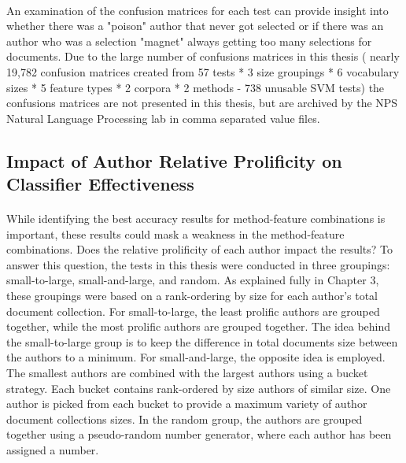 	\paragraph*{} An examination of the confusion matrices for each test can provide insight into whether there was a "poison" author that never got selected or if there was an author who was a selection "magnet" always getting too many selections for documents.  Due to the large number of confusions matrices in this thesis ( nearly 19,782 confusion matrices created from 57 tests * 3 size groupings * 6 vocabulary sizes * 5 feature types * 2 corpora * 2 methods -  738 unusable SVM tests) the confusions matrices are not presented in this thesis, but are archived by the NPS Natural Language Processing lab in comma separated value files.

\begin{singlespace}
\section{Impact of Author Relative Prolificity on Classifier Effectiveness}
\end{singlespace}
	\paragraph*{} While identifying the best accuracy results for method-feature combinations is important, these results could mask a weakness in the method-feature combinations.  Does the relative prolificity of each author impact the results?  To answer this question, the tests in this thesis were conducted in three groupings: small-to-large, small-and-large, and random.  As explained fully in Chapter 3, these groupings were based on a rank-ordering by size for each author's total document collection.  For small-to-large, the least prolific authors are grouped together, while the most prolific authors are grouped together. The idea behind the small-to-large group is to keep the difference in total documents size between the authors to a minimum. For small-and-large, the opposite idea is employed.  The smallest authors are combined with the largest authors using a bucket strategy.  Each bucket contains rank-ordered by size authors of similar size.  One author is picked from each bucket to provide a maximum variety of author document collections sizes.  In the random group, the authors are grouped together using a pseudo-random number generator, where each author has been assigned a number.
